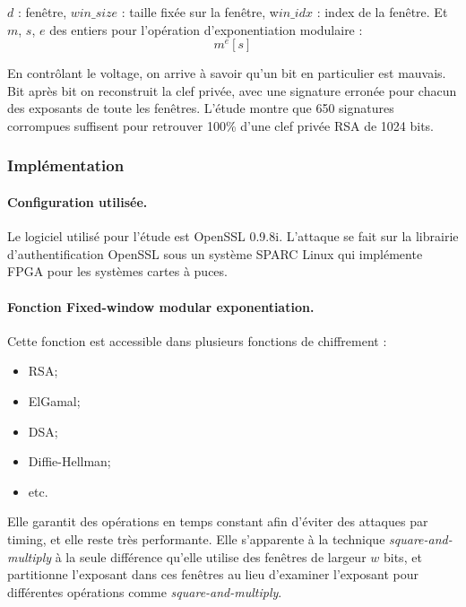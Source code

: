 			$d$ : fenêtre, $win\_size$ : taille fixée sur la fenêtre, w$in\_idx$ : index de la fenêtre. Et $m$, $s$, $e$ des entiers pour l'opération d'exponentiation modulaire :
			$$ m^e [s]$$

			En contrôlant le voltage, on arrive à savoir qu'un bit en particulier est mauvais. Bit après bit on reconstruit la clef privée, avec une signature erronée pour chacun des exposants de toute les fenêtres. L'étude montre que 650 signatures corrompues suffisent pour retrouver 100\% d'une clef privée RSA de 1024 bits. 

		
		\subsubsection{Implémentation}
			
			\paragraph{Configuration utilisée.\\}
			
			Le logiciel utilisé pour l'étude est OpenSSL 0.9.8i. L'attaque se fait sur la librairie d'authentification OpenSSL sous un système SPARC Linux qui implémente FPGA pour les systèmes cartes à puces.

			\paragraph{Fonction Fixed-window modular exponentiation.\\}

			Cette fonction est accessible dans plusieurs fonctions de chiffrement :
			\begin{itemize}
			\item RSA;
			\item ElGamal;
			\item DSA;
			\item Diffie-Hellman;
			\item etc.\\
			\end{itemize}
		
			Elle garantit des opérations en temps constant afin d'éviter des attaques par timing, et elle reste très performante. Elle s'apparente à la technique \textit{square-and-multiply} à la seule différence qu'elle utilise des fenêtres de largeur $w$ bits, et partitionne l'exposant dans ces fenêtres au lieu d'examiner l'exposant pour différentes opérations comme \textit{square-and-multiply}. \\

